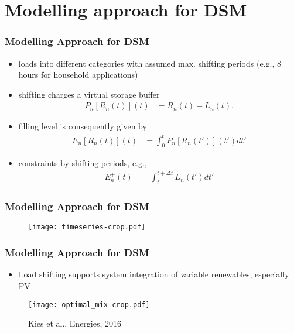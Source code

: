 \documentclass[10pt,aspectratio=169,dvipsnames]{beamer}
\let\olditem\item
\renewcommand{\item}{%
\olditem\vspace{5pt}}
\begin{document}
\section{Modelling approach for DSM}
\begin{frame}
 \frametitle{Modelling Approach for DSM}
  \begin{itemize}
  \item loads into different categories with assumed max. shifting periods (e.g., 8 hours for household applications)
  \item shifting charges a virtual storage buffer
  \begin{align}
 P_n[R_n(t)](t) &= R_n(t) - L_n(t).
\end{align}
\item filling level is consequently given by
\begin{align}
 E_n[R_n(t)](t) &= \int_0^t P_n[R_n(t')](t') dt'
\end{align}
\item constraints by shifting periods, e.g.,
\begin{align}
  E^{+}_n(t) &= \int_t^{t+\Delta t} L_n(t') dt'
\end{align}
 \end{itemize}

\end{frame}
\begin{frame}
\frametitle{Modelling Approach for DSM}
   \begin{figure}
  \begin{center}
 \texttt{[image: timeseries-crop.pdf]}
\end{center}

 \end{figure}
\end{frame}

\begin{frame}
\frametitle{Modelling Approach for DSM}
 \begin{itemize}
 \item Load shifting supports system integration of variable renewables, especially PV
 \end{itemize}
 \begin{figure}
  \begin{center}
\texttt{[image: optimal\_mix-crop.pdf]}
 \caption{Kies et al., Energies, 2016}
\end{center}

 \end{figure}
 \end{frame}
\end{document}
